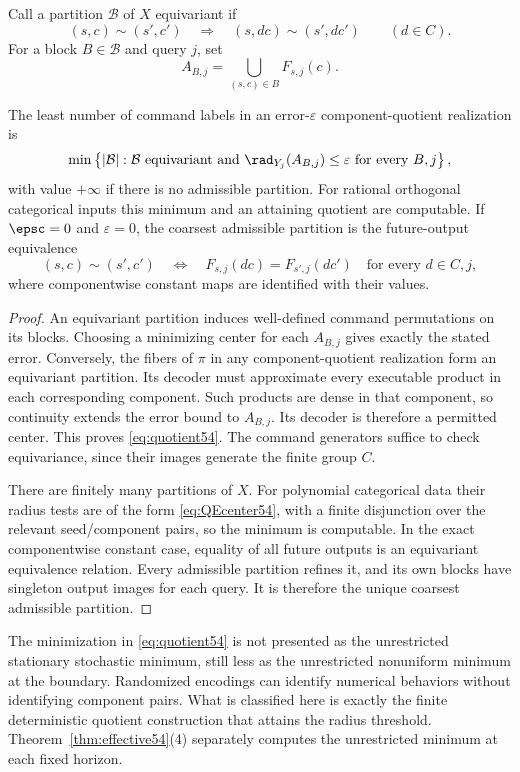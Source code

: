 Call a partition $\mathcal B$ of $X$ equivariant if
\[
 (s,c)\sim(s',c')\quad\Longrightarrow\quad
 (s,dc)\sim(s',dc')\qquad(d\in C).
\]
For a block $B\in\mathcal B$ and query $j$, set
\[
 A_{B,j}=\bigcup_{(s,c)\in B}F_{s,j}(c).
\]
\begin{theorem}\label{thm:quotient54}
The least number of command labels in an error-$\varepsilon$ component-quotient realization is
\begin{equation}\label{eq:quotient54}
 \min\left\{|\mathcal B|:\mathcal B\text{ equivariant and }
         \rad_{Y_j}(A_{B,j})\le\varepsilon\text{ for every }B,j\right\},
\end{equation}
with value $+\infty$ if there is no admissible partition. For rational orthogonal categorical inputs this minimum and an attaining quotient are computable. If $\epsc=0$ and $\varepsilon=0$, the coarsest admissible partition is the future-output equivalence
\[
 (s,c)\sim(s',c')\quad\Longleftrightarrow\quad
 F_{s,j}(dc)=F_{s',j}(dc')\quad\text{for every }d\in C,j,
\]
where componentwise constant maps are identified with their values.
\end{theorem}
\begin{proof}
An equivariant partition induces well-defined command permutations on its blocks. Choosing a minimizing center for each $A_{B,j}$ gives exactly the stated error. Conversely, the fibers of $\pi$ in any component-quotient realization form an equivariant partition. Its decoder must approximate every executable product in each corresponding component. Such products are dense in that component, so continuity extends the error bound to $A_{B,j}$. Its decoder is therefore a permitted center. This proves \eqref{eq:quotient54}. The command generators suffice to check equivariance, since their images generate the finite group $C$.

There are finitely many partitions of $X$. For polynomial categorical data their radius tests are of the form \eqref{eq:QEcenter54}, with a finite disjunction over the relevant seed/component pairs, so the minimum is computable. In the exact componentwise constant case, equality of all future outputs is an equivariant equivalence relation. Every admissible partition refines it, and its own blocks have singleton output images for each query. It is therefore the unique coarsest admissible partition.
\end{proof}
The minimization in \eqref{eq:quotient54} is not presented as the unrestricted stationary stochastic minimum, still less as the unrestricted nonuniform minimum at the boundary. Randomized encodings can identify numerical behaviors without identifying component pairs. What is classified here is exactly the finite deterministic quotient construction that attains the radius threshold. Theorem~\ref{thm:effective54}(4) separately computes the unrestricted minimum at each fixed horizon.
